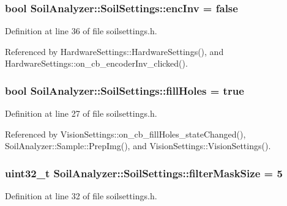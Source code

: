 \subsubsection[{enc\+Inv}]{\setlength{\rightskip}{0pt plus 5cm}bool Soil\+Analyzer\+::\+Soil\+Settings\+::enc\+Inv = false}\label{class_soil_analyzer_1_1_soil_settings_ad831e13b61fc2097219bbf7252f045d5}


Definition at line 36 of file soilsettings.\+h.



Referenced by Hardware\+Settings\+::\+Hardware\+Settings(), and Hardware\+Settings\+::on\+\_\+cb\+\_\+encoder\+Inv\+\_\+clicked().

\hypertarget{class_soil_analyzer_1_1_soil_settings_a2c9dbe9429742aed1da9d9683da5cc1e}{}
\subsubsection[{fill\+Holes}]{\setlength{\rightskip}{0pt plus 5cm}bool Soil\+Analyzer\+::\+Soil\+Settings\+::fill\+Holes = true}\label{class_soil_analyzer_1_1_soil_settings_a2c9dbe9429742aed1da9d9683da5cc1e}


Definition at line 27 of file soilsettings.\+h.



Referenced by Vision\+Settings\+::on\+\_\+cb\+\_\+fill\+Holes\+\_\+state\+Changed(), Soil\+Analyzer\+::\+Sample\+::\+Prep\+Img(), and Vision\+Settings\+::\+Vision\+Settings().

\hypertarget{class_soil_analyzer_1_1_soil_settings_ad9d5071bbf6d10638df024e883c6199f}{}
\subsubsection[{filter\+Mask\+Size}]{\setlength{\rightskip}{0pt plus 5cm}uint32\+\_\+t Soil\+Analyzer\+::\+Soil\+Settings\+::filter\+Mask\+Size = 5}\label{class_soil_analyzer_1_1_soil_settings_ad9d5071bbf6d10638df024e883c6199f}


Definition at line 32 of file soilsettings.\+h.



